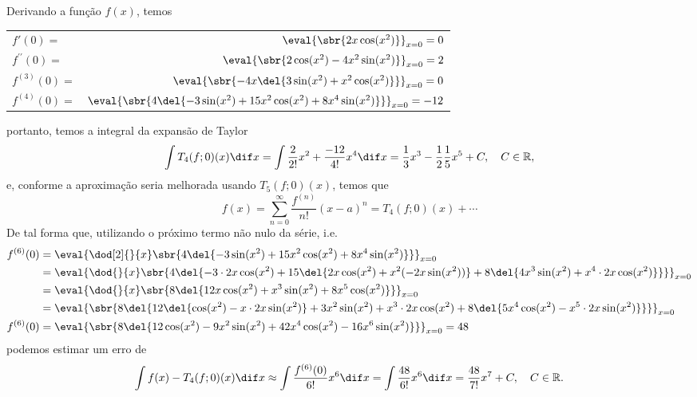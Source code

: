 \documentclass{IMTexam}
\begin{document}
\begin{questions}
        \begin{solution}
            Derivando a função $f(x)$, temos
            \begin{center}
                \begin{tabular}{lr}\toprule
                    $f'(0)=$ & $\eval{\sbr{2x\cos(x^2)}}_{x=0}=0$\\
                    $f^{\prime\prime}(0)=$ & $\eval{\sbr{2\cos(x^2)-4x^2\sin (x^2)}}_{x=0}=2$ \\
                    $f^{(3)}(0)=$ & $\eval{\sbr{-4x\del{3\sin(x^2)+x^2\cos(x^2)}}}_{x=0}=0$ \\
                    $f^{(4)}(0)=$ & $\eval{\sbr{4\del{-3\sin(x^2)+15x^2\cos (x^2)+8x^4\sin(x^2)}}}_{x=0}=-12$\\
                    \bottomrule
                \end{tabular}
            \end{center}
            portanto, temos a integral da expansão de Taylor
            \[ \int T_4(f;0)(x)\dif x=\int \dfrac{2}{2!}x^2+\dfrac{-12}{4!}x^4\dif x=\dfrac{1}{3}x^3-\dfrac{1}{2}\dfrac{1}{5}x^5+C,\quad C\in\mathbb{R}, \]
            e, conforme a aproximação seria melhorada usando $T_5(f;0)(x)$, temos que
            \[ f(x)= \sum_{n = 0}^\infty \dfrac{f^{(n)}}{n!}(x - a)^n=
            T_4(f;0)(x) + \cdots\]
            De tal forma que, utilizando o próximo termo não nulo da série, i.e.
            \begin{align*}
                f^{(6)}(0)&=\eval{\dod[2]{}{x}\sbr{4\del{-3\sin(x^2)+15x^2\cos (x^2)+8x^4\sin(x^2)}}}_{x=0}\\
                &=\eval{\dod{}{x}\sbr{4\del{-3\cdot 2x\cos(x^2)+15\del{2x\cos (x^2)+x^2(-2x\sin(x^2))}+8\del{4x^3\sin(x^2)+x^4\cdot 2x\cos(x^2)}}}}_{x=0}\\
                &=\eval{\dod{}{x}\sbr{8\del{12x\cos (x^2)+x^3\sin(x^2)+8x^5\cos(x^2)}}}_{x=0}\\
                &=\eval{\sbr{8\del{12\del{\cos (x^2)-x\cdot 2x\sin(x^2)}+3x^2\sin(x^2)+x^3\cdot 2x\cos(x^2)+8\del{5x^4\cos(x^2)-x^5\cdot 2x\sin(x^2)}}}}_{x=0}\\
                f^{(6)}(0)&=\eval{\sbr{8\del{12\cos (x^2)-9x^2\sin(x^2)+42x^4\cos(x^2)-16x^6\sin(x^2)}}}_{x=0}=48
            \end{align*}
            podemos estimar um erro de
            \[\int f(x)-T_4(f;0)(x)\dif x \approx \int \dfrac{f^{(6)}(0)}{6!}x^6 \dif x=\int \dfrac{48}{6!}x^6\dif x=\dfrac{48}{7!}x^7+C,\quad C\in\mathbb{R}. \]

        \end{solution}
    \end{questions}
\end{document}
